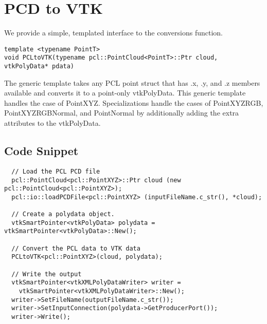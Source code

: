 \documentclass{ComputationalAlgorithmsArticle}
\begin{document}
\section{PCD to VTK}
We provide a simple, templated interface to the conversions function.
\begin{verbatim}
template <typename PointT> 
void PCLtoVTK(typename pcl::PointCloud<PointT>::Ptr cloud, vtkPolyData* pdata)
\end{verbatim}

The generic template takes any PCL point struct that has .x, .y, and .z members available and converts it to a point-only vtkPolyData. This generic template handles the case of PointXYZ. Specializations handle the cases of PointXYZRGB, PointXYZRGBNormal, and PointNormal by additionally adding the extra attributes to the vtkPolyData.

\subsection{Code Snippet}

\begin{verbatim}
  // Load the PCL PCD file
  pcl::PointCloud<pcl::PointXYZ>::Ptr cloud (new pcl::PointCloud<pcl::PointXYZ>);
  pcl::io::loadPCDFile<pcl::PointXYZ> (inputFileName.c_str(), *cloud);

  // Create a polydata object.
  vtkSmartPointer<vtkPolyData> polydata = vtkSmartPointer<vtkPolyData>::New();

  // Convert the PCL data to VTK data
  PCLtoVTK<pcl::PointXYZ>(cloud, polydata);

  // Write the output
  vtkSmartPointer<vtkXMLPolyDataWriter> writer =
    vtkSmartPointer<vtkXMLPolyDataWriter>::New();
  writer->SetFileName(outputFileName.c_str());
  writer->SetInputConnection(polydata->GetProducerPort());
  writer->Write();
  
\end{verbatim}
\end{document}
